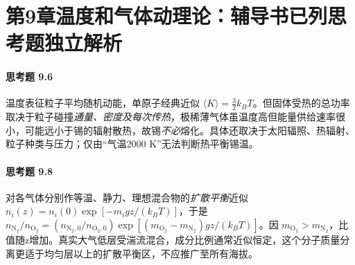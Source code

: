 \section*{第9章\quad 温度和气体动理论：辅导书已列思考题独立解析}
\paragraph{思考题 9.6}
温度表征粒子平均随机动能，单原子经典近似 \(\langle K\rangle=\frac32 k_BT\)。但固体受热的总功率取决于粒子碰撞\emph{通量、密度及每次传热}，极稀薄气体虽温度高但能量供给速率很小，可能远小于锡的辐射散热，故锡\emph{不必}熔化。具体还取决于太阳辐照、热辐射、粒子种类与压力；仅由“气温2000 K”无法判断热平衡锡温。

\paragraph{思考题 9.8}
对各气体分别作等温、静力、理想混合物的\emph{扩散平衡}近似 \(n_i(z)=n_i(0)\exp[-m_i gz/(k_BT)]\)，于是 \(\boxed{n_{\mathrm{N_2}}/n_{\mathrm{O_2}}=(n_{\mathrm{N_2},0}/n_{\mathrm{O_2},0})\exp[(m_{\mathrm{O_2}}-m_{\mathrm{N_2}})gz/(k_BT)]}\)。因 \(m_{\mathrm{O_2}}>m_{\mathrm{N_2}}\)，比值随z增加。真实大气低层受湍流混合，成分比例通常近似恒定，这个分子质量分离更适于均匀层以上的扩散平衡区，不应推广至所有海拔。
